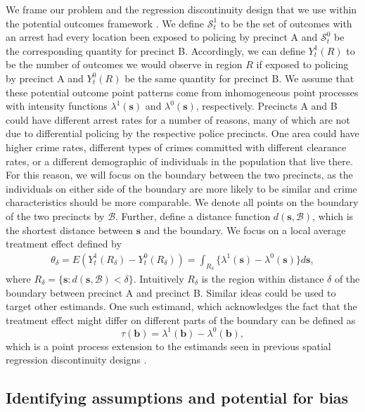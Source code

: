 \documentclass[a4paper,11pt]{article}
\begin{document}
We frame our problem and the regression discontinuity design that we use within the potential outcomes framework \citep{rubin1974estimating}. We define $\mathcal{S}_t^1$ to be the set of outcomes with an arrest had every location been exposed to policing by precinct A and $\mathcal{S}_t^0$ be the corresponding quantity for precinct B. Accordingly, we can define $Y_t^1(R)$ to be the number of outcomes we would observe in region $R$ if exposed to policing by precinct A and $Y_t^0(R)$ be the same quantity for precinct B. We assume that these potential outcome point patterns come from inhomogeneous point processes with intensity functions $\lambda^1(\boldsymbol{s})$ and $\lambda^0(\boldsymbol{s})$, respectively. Precincts A and B could have different arrest rates for a number of reasons, many of which are not due to differential policing by the respective police precincts. One area could have higher crime rates, different types of crimes committed with different clearance rates, or a different demographic of individuals in the population that live there. For this reason, we will focus on the boundary between the two precincts, as the individuals on either side of the boundary are more likely to be similar and crime characteristics should be more comparable. We denote all points on the boundary of the two precincts by $\mathcal{B}$. Further, define a distance function $d(\boldsymbol{s}, \mathcal{B})$, which is the shortest distance between $\boldsymbol{s}$ and the boundary. We focus on a local average treatment effect defined by 
\begin{align}
  \theta_{\delta} = E(Y_t^1(R_{\delta}) - Y_t^0(R_{\delta})) = \int_{R_{\delta}} \{ \lambda^1(\boldsymbol{s}) - \lambda^0(\boldsymbol{s}) \} d \boldsymbol{s},  \label{eqn:LATE}
\end{align}
where $R_{\delta} = \{ \boldsymbol{s}:d(\boldsymbol{s}, \mathcal{B}) < \delta \}$. Intuitively $R_{\delta}$ is the region within distance $\delta$ of the boundary between precinct A and precinct B. Similar ideas could be used to target other estimands. One such estimand, which acknowledges the fact that the treatment effect might differ on different parts of the boundary can be defined as 
$$\tau(\boldsymbol{b}) = \lambda^1(\boldsymbol{b}) - \lambda^0(\boldsymbol{b}),$$
which is a point process extension to the estimands seen in previous spatial regression discontinuity designs \citep{keele2015geographic, rischard2020school}.

\subsection{Identifying assumptions and potential for bias}
\end{document}
